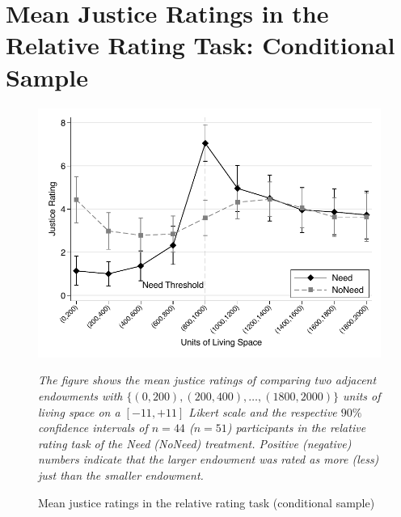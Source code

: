 \documentclass[12pt]{scrartcl}
\begin{document}
\section{Mean Justice Ratings in the Relative Rating Task: Conditional Sample}\label{sec:app_conditional_relative}
\begin{figure}[ht!]
   \centering
   \includegraphics{figures/figure_14.pdf}
   \begin{minipage}{\linewidth}
      \footnotesize
      \textit{The figure shows the mean justice ratings of comparing two adjacent endowments with $\{(0,200),(200,400),\ldots,(1800,2000)\}$ units of living space on a $[-11,+11]$ Likert scale and the respective $90\%$ confidence intervals of $n=44$ ($n=51$) participants in the relative rating task of the Need (NoNeed) treatment. Positive (negative) numbers indicate that the larger endowment was rated as more (less) just than the smaller endowment.}
   \end{minipage}
   \caption{Mean justice ratings in the relative rating task (conditional sample)}
   \label{fig:figure_14}
\end{figure}
\end{document}
